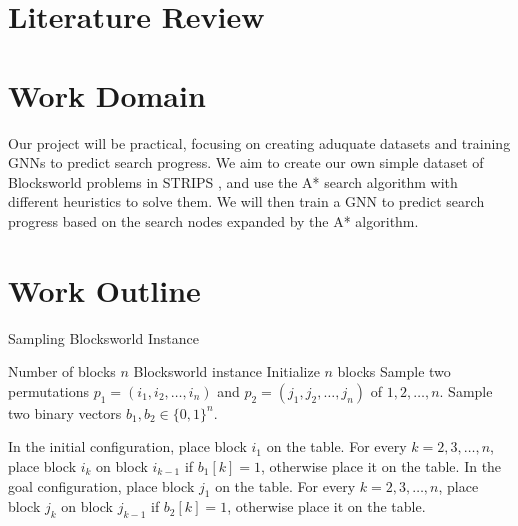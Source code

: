 \documentclass[12pt]{article}
\begin{document}
\section{Literature Review}



\section{Work Domain}

Our project will be practical, focusing on creating aduquate datasets and training GNNs to predict search progress. We aim to create our own simple dataset of Blocksworld problems in STRIPS \cite{strips1971}, and use the A* search algorithm with different heuristics to solve them. We will then train a GNN to predict search progress based on the search nodes expanded by the A* algorithm.

\section{Work Outline}

\begin{algorithm}
  \caption{Sampling Blocksworld Instance}
  \label{alg:sample_blocksworld}
  \begin{algorithmic}[1]
    \Require Number of blocks $n$
    \Ensure Blocksworld instance
    \State Initialize $n$ blocks
    \State Sample two permutations $p_1 = (i_1, i_2, \ldots, i_n)$ and $p_2 = (j_1, j_2, \ldots, j_n)$ of $1, 2, \ldots, n$.
    \State Sample two binary vectors $b_1, b_2 \in \{0, 1\}^n$.

    \State In the initial configuration, place block $i_1$ on the table. For every $k = 2, 3, \ldots, n$, place block $i_k$ on block $i_{k-1}$ if $b_1[k] = 1$, otherwise place it on the table.
    \State In the goal configuration, place block $j_1$ on the table. For every $k = 2, 3, \ldots, n$, place block $j_k$ on block $j_{k-1}$ if $b_2[k] = 1$, otherwise place it on the table.

  \end{algorithmic}
\end{algorithm}
\end{document}
